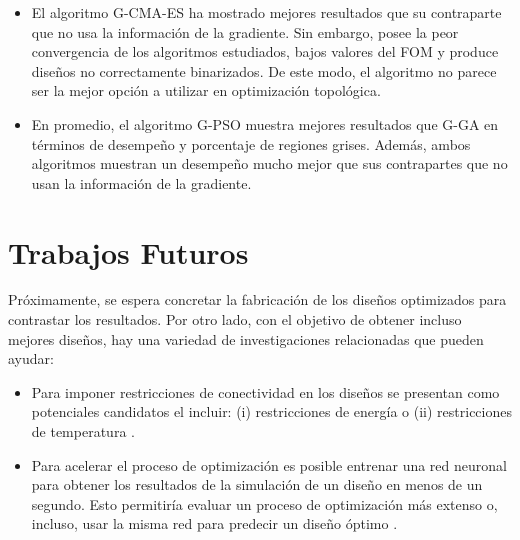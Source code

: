 \begin{itemize}
  \item El algoritmo G-CMA-ES ha mostrado mejores resultados que su contraparte que no usa
        la información de la gradiente. Sin embargo, posee la peor convergencia de los
        algoritmos estudiados, bajos valores del FOM y 
        produce diseños no correctamente binarizados.
        De este modo, el algoritmo no parece ser la mejor opción a utilizar en optimización
        topológica. 
        
  \item En promedio, el algoritmo G-PSO muestra mejores resultados que G-GA en
        términos de desempeño y porcentaje de regiones grises.
        Además, ambos algoritmos muestran un desempeño mucho mejor
        que sus contrapartes que no usan la información de la gradiente.

\end{itemize}

\section{Trabajos Futuros}

Próximamente, se espera concretar la fabricación de los diseños optimizados para
contrastar los resultados. Por otro lado, con el objetivo de obtener incluso mejores
diseños, hay una variedad de investigaciones relacionadas que pueden ayudar:

\begin{itemize}
  \item Para imponer restricciones de conectividad en los diseños se presentan
        como potenciales candidatos el incluir:
        (i) restricciones de energía \citep{Zhang2021} o
        (ii) restricciones de temperatura \citep{Li2016}.

  \item Para acelerar el proceso de optimización es posible entrenar una
        red neuronal para obtener los resultados de la simulación de un diseño
        en menos de un segundo. Esto permitiría evaluar un proceso de optimización
        más extenso o, incluso, usar la misma red para predecir un diseño óptimo
        \citep{Liu2018, Peurifor2018}.

\end{itemize}
